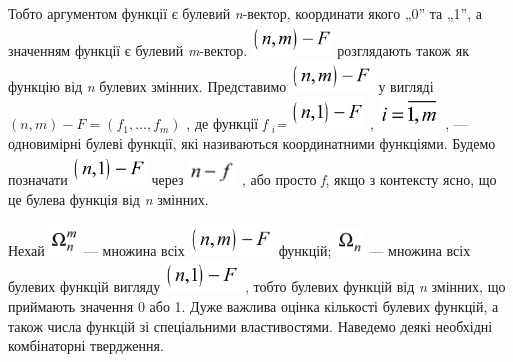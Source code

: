 Тобто аргументом функції є булевий \textit{n}{}-вектор, координати якого „0” та
„1”,  а значенням функції є булевий \textit{m}{}-вектор. 
\includegraphics[width=0.8417in,height=0.3346in]{crypt-img/crypt-img84.png} 
розглядають також як функцію від \textit{n} булевих змінних. Представимо 
\includegraphics[width=0.8618in,height=0.3354in]{crypt-img/crypt-img85.png}  у
вигляді   $(n,m)-F=(f_{1},\dots,f_m)$ ,  де функції
\textit{f} ${}_i$\textit{=}
\includegraphics[width=0.7709in,height=0.3335in]{crypt-img/crypt-img86.png} , 
\includegraphics[width=0.6457in,height=0.3327in]{crypt-img/crypt-img87.png} , ---
одновимірні  булеві функції, які називаються координатними функціями. Будемо
позначати 
\includegraphics[width=0.7752in,height=0.3354in]{crypt-img/crypt-img88.png} 
через  
\includegraphics[width=0.5102in,height=0.2709in]{crypt-img/crypt-img89.png}  ,
або просто \textit{f}, якщо з контексту ясно, що це булева функція від
\textit{n} змінних. 

Нехай 
\includegraphics[width=0.3118in,height=0.3335in]{crypt-img/crypt-img90.png}  ---
множина всіх 
\includegraphics[width=0.8811in,height=0.3339in]{crypt-img/crypt-img91.png} 
функцій; 
\includegraphics[width=0.2984in,height=0.2984in]{crypt-img/crypt-img92.png}  ---
множина всіх булевих функцій вигляду  
\includegraphics[width=0.7866in,height=0.3346in]{crypt-img/crypt-img93.png} ,
тобто булевих функцій від \textit{n }змінних, що приймають значення 0 або 1.
Дуже важлива оцінка кількості  булевих функцій, а також числа функцій зі
спеціальними властивостями. Наведемо деякі необхідні комбінаторні твердження.

